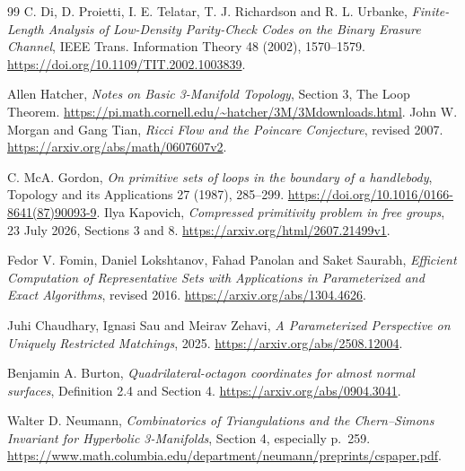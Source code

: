 \documentclass[11pt]{article}
\theoremstyle{remark}
\begin{document}
\begin{thebibliography}{99}
C. Di, D. Proietti, I. E. Telatar, T. J. Richardson and R. L. Urbanke,
\emph{Finite-Length Analysis of Low-Density Parity-Check Codes on the Binary
Erasure Channel}, IEEE Trans. Information Theory 48 (2002), 1570--1579.
\url{https://doi.org/10.1109/TIT.2002.1003839}.

 Allen Hatcher,
\emph{Notes on Basic 3-Manifold Topology}, Section 3, The Loop Theorem.
\url{https://pi.math.cornell.edu/~hatcher/3M/3Mdownloads.html}.
 John W. Morgan and Gang Tian,
\emph{Ricci Flow and the Poincare Conjecture}, revised 2007.
\url{https://arxiv.org/abs/math/0607607v2}.

 C. McA. Gordon,
\emph{On primitive sets of loops in the boundary of a handlebody},
Topology and its Applications 27 (1987), 285--299.
\url{https://doi.org/10.1016/0166-8641(87)90093-9}.
 Ilya Kapovich,
\emph{Compressed primitivity problem in free groups}, 23 July 2026,
Sections 3 and 8. \url{https://arxiv.org/html/2607.21499v1}.

 Fedor V. Fomin, Daniel Lokshtanov, Fahad Panolan
and Saket Saurabh,
\emph{Efficient Computation of Representative Sets with Applications in
Parameterized and Exact Algorithms}, revised 2016.
\url{https://arxiv.org/abs/1304.4626}.

 Juhi Chaudhary, Ignasi Sau and Meirav Zehavi,
\emph{A Parameterized Perspective on Uniquely Restricted Matchings}, 2025.
\url{https://arxiv.org/abs/2508.12004}.

 Benjamin A. Burton,
\emph{Quadrilateral-octagon coordinates for almost normal surfaces},
Definition 2.4 and Section 4.
\url{https://arxiv.org/abs/0904.3041}.

 Walter D. Neumann,
\emph{Combinatorics of Triangulations and the Chern--Simons Invariant for
Hyperbolic 3-Manifolds}, Section 4, especially p.~259.
\url{https://www.math.columbia.edu/department/neumann/preprints/cspaper.pdf}.

\end{thebibliography}

\appendix
\end{document}
